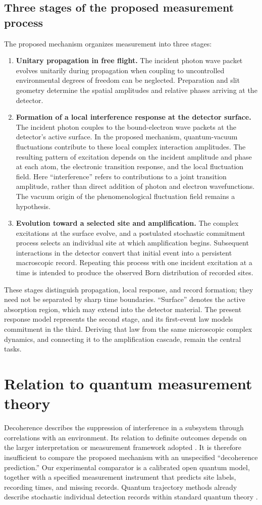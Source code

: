 \documentclass[11pt]{article}
\begin{document}
\subsection{Three stages of the proposed measurement process}
The proposed mechanism organizes measurement into three stages:
\begin{enumerate}
\item \textbf{Unitary propagation in free flight.} The incident photon wave packet evolves unitarily during propagation when coupling to uncontrolled environmental degrees of freedom can be neglected. Preparation and slit geometry determine the spatial amplitudes and relative phases arriving at the detector.
\item \textbf{Formation of a local interference response at the detector surface.} The incident photon couples to the bound-electron wave packets at the detector's active surface. In the proposed mechanism, quantum-vacuum fluctuations contribute to these local complex interaction amplitudes. The resulting pattern of excitation depends on the incident amplitude and phase at each atom, the electronic transition response, and the local fluctuation field. Here ``interference'' refers to contributions to a joint transition amplitude, rather than direct addition of photon and electron wavefunctions. The vacuum origin of the phenomenological fluctuation field remains a hypothesis.
\item \textbf{Evolution toward a selected site and amplification.} The complex excitations at the surface evolve, and a postulated stochastic commitment process selects an individual site at which amplification begins. Subsequent interactions in the detector convert that initial event into a persistent macroscopic record. Repeating this process with one incident excitation at a time is intended to produce the observed Born distribution of recorded sites.
\end{enumerate}
These stages distinguish propagation, local response, and record formation; they need not be separated by sharp time boundaries. ``Surface'' denotes the active absorption region, which may extend into the detector material. The present response model represents the second stage, and its first-event law models commitment in the third. Deriving that law from the same microscopic complex dynamics, and connecting it to the amplification cascade, remain the central tasks.

\section{Relation to quantum measurement theory}
Decoherence describes the suppression of interference in a subsystem through correlations with an environment. Its relation to definite outcomes depends on the larger interpretation or measurement framework adopted \cite{schlosshauer}. It is therefore insufficient to compare the proposed mechanism with an unspecified ``decoherence prediction.'' Our experimental comparator is a calibrated open quantum model, together with a specified measurement instrument that predicts site labels, recording times, and missing records. Quantum trajectory methods already describe stochastic individual detection records within standard quantum theory \cite{castin}.
\end{document}
